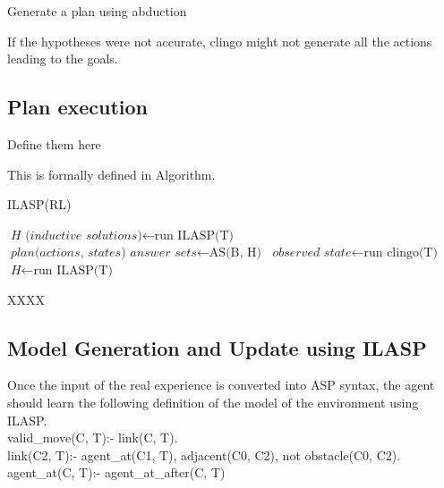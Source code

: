 Generate a plan using abduction

If the hypotheses were not accurate, clingo might not generate all the actions leading to the goals. 

\subsection{Plan execution}
\label{Plan execution}

Define them here

This is formally defined in Algorithm. 

\begin{algorithm}
\caption{ILASP(RL)}\label{euclid}
\begin{algorithmic}[1]


    \State $\textit{H (inductive solutions)} \gets \text{run ILASP(T)}$
    \State $\textit{plan(actions, states) answer sets} \gets \text{AS(B, H)}$
        \State $\textit{observed state} \gets \text{run clingo(T)}$
            \State $\textit{H} \gets \text{run ILASP(T)}$
            \EndIf
    \EndWhile
\EndWhile

\EndProcedure
\caption{XXXX }
\end{algorithmic}
\end{algorithm}

    

\subsection{Model Generation and Update using ILASP}
\label{model_generation_and_update}
Once the input of the real experience is converted into ASP syntax, the agent should learn the following definition of the model of the environment using ILASP. \\

valid\_move(C, T):- link(C, T).
\\
link(C2, T):- agent\_at(C1, T), adjacent(C0, C2), not obstacle(C0, C2).\\
agent\_at(C, T):- agent\_at\_after(C, T) \\

